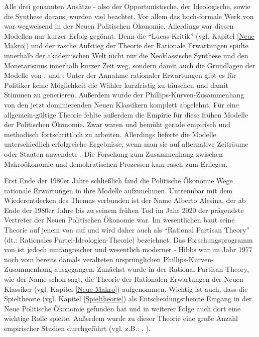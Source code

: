 Alle drei genannten Ansätze - also der Opportunistische, der Ideologische, sowie die Synthese daraus, wurden viel beachtet. Vor allem das hoch-formale Werk von \textcite{Nordhaus1975} war wegweisend in der Neuen Politischen Ökonomie. Allerdings war diesen Modellen nur kurzer Erfolg gegönnt. Denn die "`Lucas-Kritik"' (vgl. Kapitel \ref{Neue Makro}) und der rasche Aufstieg der Theorie der Rationale Erwartungen spülte innerhalb der akademischen Welt nicht nur die Neoklassische Synthese und den Monetarismus innerhalb kurzer Zeit weg, sondern damit auch die Grundlagen der Modelle von \textcite{Nordhaus1975}, \textcite{Hibbs1977} und \textcite{Schneider1978a}: Unter der Annahme rationaler Erwartungen gibt es für Politiker keine Möglichkeit die Wähler kurzfristig zu täuschen und damit Stimmen zu generieren. Außerdem wurde der Phillips-Kurven-Zusammenhang von den jetzt dominierenden Neuen Klassikern komplett abgelehnt. Für eine allgemein-gültige Theorie fehlte außerdem die Empirie für diese frühen Modelle der Politischen Ökonomie. Zwar waren \textcite{Hibbs1977} und \textcite{Schneider1978a} bemüht gerade empirisch und methodisch fortschrittlich zu arbeiten. Allerdings lieferte die Modelle unterschiedlich erfolgreiche Ergebnisse, wenn man sie auf alternative Zeiträume oder Staaten anwendete \parencite[S. 652]{Alesina1987}. Die Forschung zum Zusammenhang zwischen Makroökonomie und demokratischen Prozessen kam rasch zum Erliegen.

Erst Ende der 1980er Jahre schließlich fand die Politische Ökonomie Wege rationale Erwartungen in ihre Modelle aufzunehmen. Untrennbar mit dem Wiederentdecken des Themas verbunden ist der Name Alberto Alesina, der ab Ende der 1980er Jahre bis zu seinem frühen Tod im Jahr 2020 der prägendste Vertreter der Neuen Politischen Ökonomie war. Im wesentlichen baut seine Theorie auf jenem von \textcite{Hibbs1977} auf und wird daher auch als "`Rational Partisan Theory"' (dt.: Rationales Partei-Ideologien-Theorie) bezeichnet. Das Forschungsprogramm von \textcite{Alesina1987, Alesina1988, Alesina1989} ist jedoch umfangreicher und wesentlich moderner - Hibbs war im Jahr 1977 noch vom bereits damals veralteten ursprünglichen Phillips-Kurven-Zusammenhang ausgegangen. Zunächst wurde in der Rational Partisan Theory, wie der Name schon sagt, die Theorie der Rationalen Erwartungen der Neuen Klassiker (vgl. Kapitel \ref{Neue Makro}) aufgenommen. Wichtig ist auch, dass die Spieltheorie (vgl. Kapitel \ref{Spieltheorie}) als Entscheidungstheorie Eingang in der Neue Politische Ökonomie gefunden hat \parencite{Alesina1987} und in weiterer Folge auch dort eine wichtige Rolle spielte. Außerdem wurde zu dieser Theorie eine große Anzahl empirischer Studien durchgeführt (vgl. z.B.: \textcite{Alesina1988b}, \textcite{Alesina1992}).

